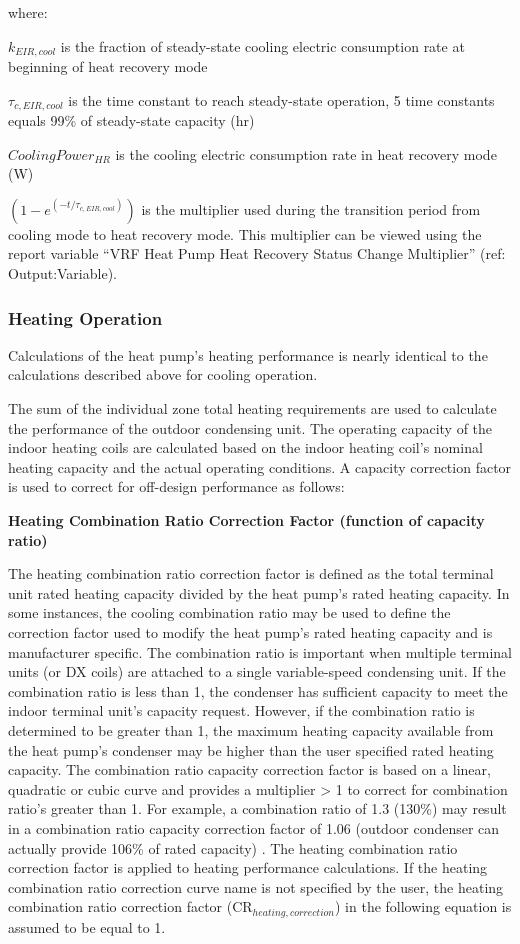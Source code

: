 where:

\(k_{EIR,cool}\) is the fraction of steady-state cooling electric consumption rate at beginning of heat recovery mode

\(\tau_{c,EIR,cool}\) is the time constant to reach steady-state operation, 5 time constants equals 99\% of steady-state capacity (hr)

\(CoolingPower_{HR}\) is the cooling electric consumption rate in heat recovery mode (W)

\(\left( 1 - e^{\left( -t / \tau_{c,EIR,cool} \right)} \right)\) is the multiplier used during the transition period from cooling mode to heat recovery mode. This multiplier can be viewed using the report variable ``VRF Heat Pump Heat Recovery Status Change Multiplier'' (ref: Output:Variable).

\subsubsection{Heating Operation}\label{heating-operation-201605050924}

Calculations of the heat pump's heating performance is nearly identical to the calculations described above for cooling operation.

The sum of the individual zone total heating requirements are used to calculate the performance of the outdoor condensing unit. The operating capacity of the indoor heating coils are calculated based on the indoor heating coil's nominal heating capacity and the actual operating conditions. A capacity correction factor is used to correct for off-design performance as follows:

\textbf{Heating Combination Ratio Correction Factor (function of capacity ratio)}

The heating combination ratio correction factor is defined as the total terminal unit rated heating capacity divided by the heat pump's rated heating capacity. In some instances, the cooling combination ratio may be used to define the correction factor used to modify the heat pump's rated heating capacity and is manufacturer specific. The combination ratio is important when multiple terminal units (or DX coils) are attached to a single variable-speed condensing unit. If the combination ratio is less than 1, the condenser has sufficient capacity to meet the indoor terminal unit's capacity request. However, if the combination ratio is determined to be greater than 1, the maximum heating capacity available from the heat pump's condenser may be higher than the user specified rated heating capacity. The combination ratio capacity correction factor is based on a linear, quadratic or cubic curve and provides a multiplier > 1 to correct for combination ratio's greater than 1. For example, a combination ratio of 1.3 (130\%) may result in a combination ratio capacity correction factor of 1.06 (outdoor condenser can actually provide 106\% of rated capacity) . The heating combination ratio correction factor is applied to heating performance calculations. If the heating combination ratio correction curve name is not specified by the user, the heating combination ratio correction factor (CR\(_{heating,correction}\)) in the following equation is assumed to be equal to 1.


